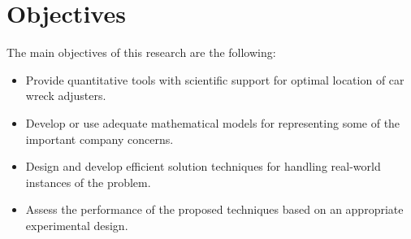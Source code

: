 \section{Objectives}
The main objectives
of this research are the following:
\begin{itemize}
\item Provide quantitative tools
  with scientific support
  for optimal location
  of car wreck adjusters.
\item Develop or use
  adequate mathematical models
  for representing
  some of the important company concerns.
\item Design and develop efficient solution techniques
  for handling real-world instances of the problem.
\item Assess 
  the performance of the proposed techniques
  based on an appropriate experimental design.
\end{itemize}

